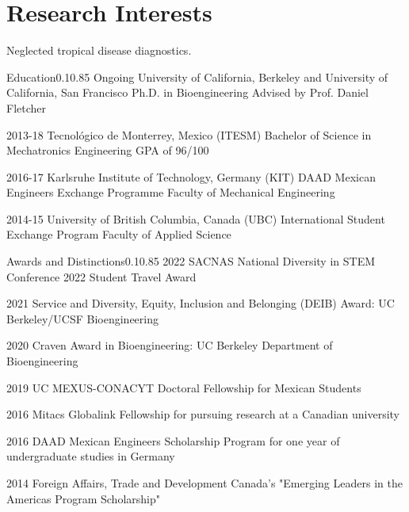 \documentclass{federico_cv}
\begin{document}
{}
{}


\section{Research Interests}
Neglected tropical disease diagnostics.


\begin{tblSection}{Education}{0.1}{0.85}
\degree
{Ongoing}
{University of California, Berkeley and University of California, San Francisco}
{Ph.D. in Bioengineering}
{Advised by Prof. Daniel Fletcher}

\degree
{2013-18}
{Tecnológico de Monterrey, Mexico (ITESM)}
{Bachelor of Science in Mechatronics Engineering}
{GPA of 96/100}

\degree
{2016-17}
{Karlsruhe Institute of Technology, Germany (KIT)}
{DAAD Mexican Engineers Exchange Programme}
{Faculty of Mechanical Engineering}

\degree
{2014-15}
{University of British Columbia, Canada (UBC)}
{International Student Exchange Program}
{Faculty of Applied Science}

\end{tblSection}


\let\thefootnote\relax{}\nocite{*}
\printbibliography[keyword={Publications},title={Publications},resetnumbers=true]



\begin{tblSection}{Awards and Distinctions}{0.1}{0.85}
\award
{2022}
{SACNAS National Diversity in STEM Conference 2022 Student Travel Award}

\award
{2021}
{Service and Diversity, Equity, Inclusion and Belonging (DEIB) Award: UC Berkeley/UCSF Bioengineering}

\award
{2020}
{Craven Award in Bioengineering: UC Berkeley Department of Bioengineering}

\award
{2019}
{UC MEXUS-CONACYT Doctoral Fellowship for Mexican Students}

\award
{2016}
{Mitacs Globalink Fellowship for pursuing research at a Canadian university}

\award
{2016}
{DAAD Mexican Engineers Scholarship Program for one year of undergraduate studies in Germany}

\award
{2014}
{Foreign Affairs, Trade and Development Canada's "Emerging Leaders in the Americas Program Scholarship"}

\end{tblSection}
\end{document}

